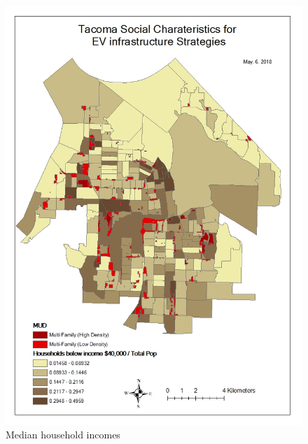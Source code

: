 \documentclass[]{article}
\begin{document}
\begin{figure}
\centering
\includegraphics{./figs/income.jpg}
\caption{Median household incomes}
\end{figure}
\end{document}

